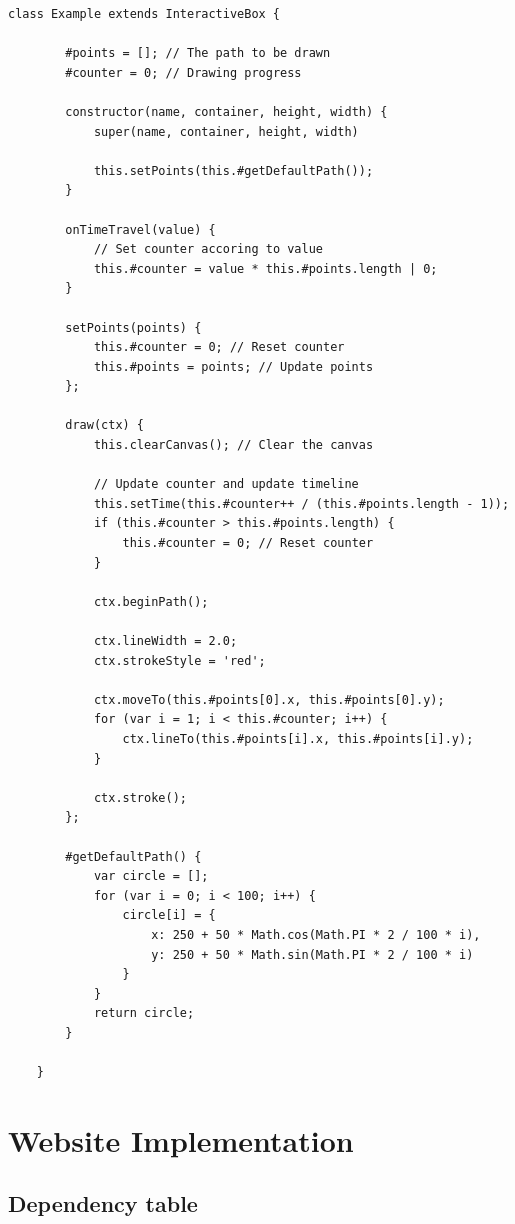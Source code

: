 \documentclass{article}
\begin{document}
\begin{lstlisting}[style=js]
    class Example extends InteractiveBox {

        #points = []; // The path to be drawn
        #counter = 0; // Drawing progress

        constructor(name, container, height, width) {
            super(name, container, height, width)

            this.setPoints(this.#getDefaultPath());
        }

        onTimeTravel(value) {
            // Set counter accoring to value
            this.#counter = value * this.#points.length | 0;
        }

        setPoints(points) {
            this.#counter = 0; // Reset counter
            this.#points = points; // Update points
        };

        draw(ctx) {
            this.clearCanvas(); // Clear the canvas
            
            // Update counter and update timeline
            this.setTime(this.#counter++ / (this.#points.length - 1));
            if (this.#counter > this.#points.length) {
                this.#counter = 0; // Reset counter
            }

            ctx.beginPath();
            
            ctx.lineWidth = 2.0;
            ctx.strokeStyle = 'red';

            ctx.moveTo(this.#points[0].x, this.#points[0].y);
            for (var i = 1; i < this.#counter; i++) {
                ctx.lineTo(this.#points[i].x, this.#points[i].y);
            }

            ctx.stroke();
        };

        #getDefaultPath() {
            var circle = [];
            for (var i = 0; i < 100; i++) {
                circle[i] = {
                    x: 250 + 50 * Math.cos(Math.PI * 2 / 100 * i),
                    y: 250 + 50 * Math.sin(Math.PI * 2 / 100 * i)
                }
            }
            return circle;
        }

    }
\end{lstlisting}

\pagebreak

\section{Website Implementation}

\subsection{Dependency table}
\end{document}
